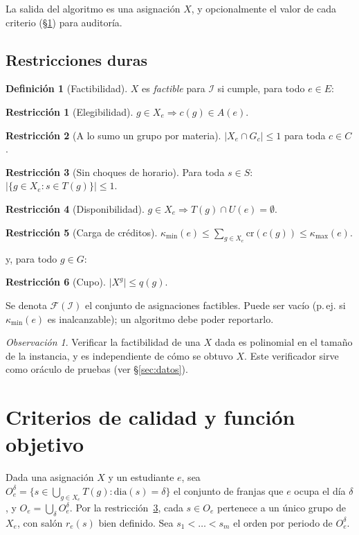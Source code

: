 \documentclass[11pt,letterpaper]{article}
\theoremstyle{definition}
\newtheorem{definicion}{Definición}
\newtheorem{restriccion}{Restricción}
\theoremstyle{remark}
\newtheorem*{obs}{Observación}
\theoremstyle{plain}
\newcommand{\card}[1]{\lvert #1 \rvert}
\begin{document}
La salida del algoritmo es una asignación $X$, y opcionalmente el valor de
cada criterio (§\ref{sec:objetivo}) para auditoría.

\subsection{Restricciones duras}
\begin{definicion}[Factibilidad]
$X$ es \emph{factible} para $\mathcal{I}$ si cumple, para todo $e\in E$:
\begin{restriccion}[Elegibilidad]\label{r:eleg}
$g\in X_e \Rightarrow c(g)\in A(e)$.
\end{restriccion}
\begin{restriccion}[A lo sumo un grupo por materia]\label{r:uno}
$\card{X_e\cap G_c}\le 1$ para toda $c\in C$.
\end{restriccion}
\begin{restriccion}[Sin choques de horario]\label{r:choque}
Para toda $s\in S$: $\card{\{g\in X_e : s\in T(g)\}}\le 1$.
\end{restriccion}
\begin{restriccion}[Disponibilidad]\label{r:disp}
$g\in X_e\Rightarrow T(g)\cap U(e)=\emptyset$.
\end{restriccion}
\begin{restriccion}[Carga de créditos]\label{r:cred}
$\kappa_{\min}(e)\le\sum_{g\in X_e}\mathrm{cr}(c(g))\le\kappa_{\max}(e)$.
\end{restriccion}
y, para todo $g\in G$:
\begin{restriccion}[Cupo]\label{r:cupo}
$\card{X^g}\le q(g)$.
\end{restriccion}
\end{definicion}
Se denota $\mathcal{F}(\mathcal{I})$ el conjunto de asignaciones factibles.
Puede ser vacío (p.\,ej. si $\kappa_{\min}(e)$ es inalcanzable); un
algoritmo debe poder reportarlo.

\begin{obs}
Verificar la factibilidad de una $X$ dada es polinomial en el tamaño de la
instancia, y es independiente de cómo se obtuvo $X$. Este verificador sirve
como oráculo de pruebas (ver §\ref{sec:datos}).
\end{obs}

\section{Criterios de calidad y función objetivo}\label{sec:objetivo}
Dada una asignación $X$ y un estudiante $e$, sea
$O_e^\delta=\{s\in\bigcup_{g\in X_e}T(g) : \mathrm{dia}(s)=\delta\}$
el conjunto de franjas que $e$ ocupa el día $\delta$, y
$O_e=\bigcup_\delta O_e^\delta$. Por la restricción~\ref{r:choque}, cada
$s\in O_e$ pertenece a un único grupo de $X_e$, con salón
$r_e(s)$ bien definido. Sea $s_1<\dots<s_m$ el orden por periodo de $O_e^\delta$.
\end{document}
